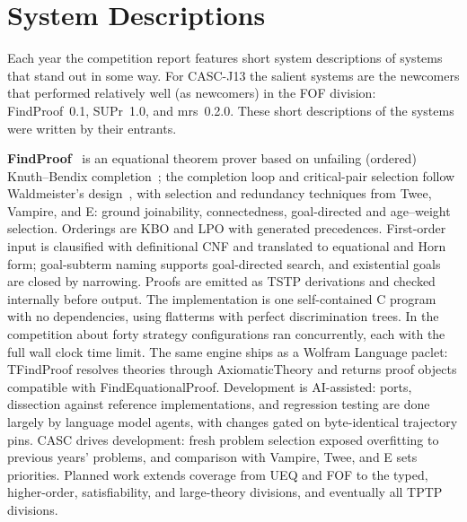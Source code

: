 \documentclass[aic]{iosart2x}
\newcommand{\THIS}{\mbox{CASC-J13}}
\begin{document}
%
\section{System Descriptions}
\label{Systems}

Each year the competition report features short system descriptions of systems that stand out in
some way.
For \THIS{} the salient systems are the newcomers that performed relatively well (as newcomers)
in the FOF division: FindProof~0.1, SUPr~1.0, and mrs~0.2.0.
These short descriptions of the systems were written by their entrants.

\textbf{FindProof}~\cite{Mur26} is an equational theorem prover based on unfailing (ordered) 
Knuth–Bendix completion~\cite{BDP89}; the completion loop and critical-pair selection follow 
Waldmeister's design~\cite{HL02}, with selection and redundancy techniques from Twee, Vampire, 
and E: ground joinability, connectedness, goal-directed and age–weight selection. 
Orderings are KBO and LPO with generated precedences. 
First-order input is clausified with definitional CNF and translated to equational and Horn form; 
goal-subterm naming supports goal-directed search, and existential goals are closed by narrowing. 
Proofs are emitted as TSTP derivations and checked internally before output.
The implementation is one self-contained C program with no dependencies, using flatterms with 
perfect discrimination trees. 
In the competition about forty strategy configurations ran concurrently, each with the full wall 
clock time limit. 
The same engine ships as a Wolfram Language paclet: TFindProof resolves theories through 
AxiomaticTheory and returns proof objects compatible with FindEquationalProof. 
Development is AI-assisted: ports, dissection against reference implementations, and regression 
testing are done largely by language model agents, with changes gated on byte-identical trajectory 
pins.
CASC drives development: fresh problem selection exposed overfitting to previous years' problems, 
and comparison with Vampire, Twee, and E sets priorities. 
Planned work extends coverage from UEQ and FOF to the typed, higher-order, satisfiability, and 
large-theory divisions, and eventually all TPTP divisions.
\end{document}
